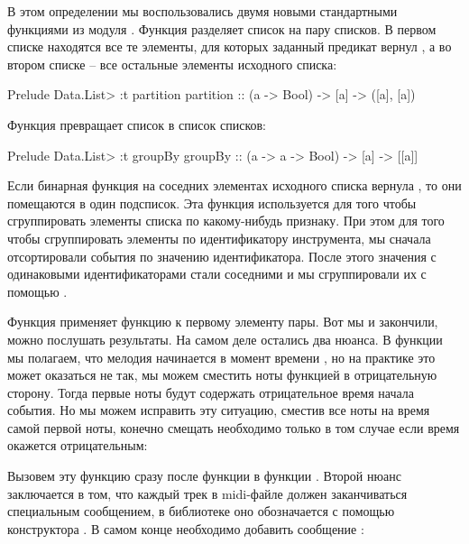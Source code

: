 В этом определении мы воспользовались двумя новыми стандартными
функциями из модуля . Функция  разделяет
список на пару списков. В первом списке находятся все те элементы, для
которых заданный предикат вернул , а во втором списке -- все
остальные элементы исходного списка:


\begin{code}
Prelude Data.List> :t partition
partition :: (a -> Bool) -> [a] -> ([a], [a])
\end{code}

Функция  превращает список в список списков:


\begin{code}
Prelude Data.List> :t groupBy
groupBy :: (a -> a -> Bool) -> [a] -> [[a]]
\end{code}

Если бинарная функция на соседних элементах исходного списка вернула
, то они помещаются в один подсписок. Эта функция используется
для того чтобы сгруппировать элементы списка по какому-нибудь признаку.
При этом для того чтобы сгруппировать элементы по идентификатору
инструмента, мы сначала отсортировали события по значению
идентификатора. После этого значения с одинаковыми идентификаторами
стали соседними и мы сгруппировали их с помощью .

Функция  применяет функцию к первому элементу пары. Вот мы и
закончили, можно послушать результаты. На самом деле остались два
нюанса. В функции  мы полагаем, что мелодия начинается в
момент времени , но на практике это может оказаться не так, мы
можем сместить ноты функцией  в отрицательную сторону. Тогда
первые ноты будут содержать отрицательное время начала события. Но мы
можем исправить эту ситуацию, сместив все ноты на время самой первой
ноты, конечно смещать необходимо только в том случае если время окажется
отрицательным:



Вызовем эту функцию сразу после функции  в функции
. Второй нюанс заключается в том, что каждый трек в
midi-файле должен заканчиваться специальным сообщением, в библиотеке
 оно обозначается с помощью конструктора . В
самом конце необходимо добавить сообщение :


